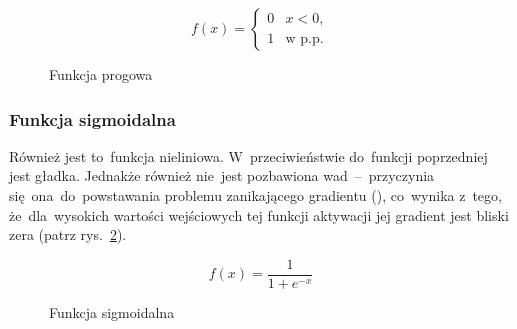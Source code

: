 \begin{minipage}[t]{\textwidth}
\begin{equation}
	f(x) =
	\begin{cases}
	0 & x<0, \\
	1 & \textrm{w p.p.}
	\end{cases}
\end{equation}

\begin{figure}[H]
    \centering
    \caption{Funkcja progowa}
    \label{rys:f.progowa}
\end{figure}
\end{minipage}

\subsubsection{Funkcja sigmoidalna}
Również jest to~funkcja nieliniowa. W~przeciwieństwie do~funkcji poprzedniej jest gładka. Jednakże również nie~jest
pozbawiona wad~--~przyczynia się~ona~do~powstawania problemu zanikającego gradientu (\cite{vanishing-gradient}),
co~wynika z~tego, że~dla~wysokich wartości wejściowych tej funkcji aktywacji jej gradient jest bliski zera (patrz
rys.~\ref{rys:f.sigmoidalna}).

\begin{minipage}[t]{\textwidth}
\begin{equation}
	f(x) = \frac{1}{1+e^{-x}}
\end{equation}

\begin{figure}[H]
    \centering
    \caption{Funkcja sigmoidalna}
    \label{rys:f.sigmoidalna}
\end{figure}
\end{minipage}

